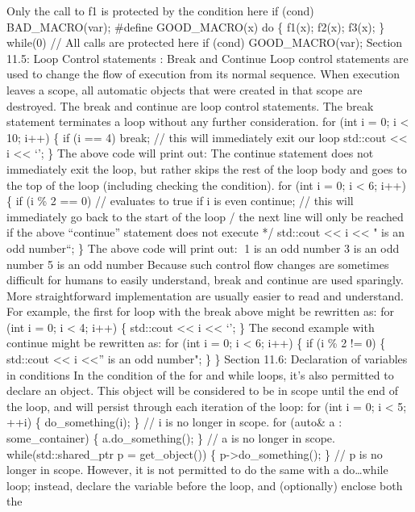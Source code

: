 {Only the call to f1 is protected by the condition here if (cond)
BAD\_MACRO(var); \#define GOOD\_MACRO(x) do \{ f1(x); f2(x); f3(x); \}
while(0) // All calls are protected here if (cond) GOOD\_MACRO(var);
Section 11.5: Loop Control statements : Break and Continue Loop control
statements are used to change the ﬂow of execution from its normal
sequence. When execution leaves a scope, all automatic objects that were
created in that scope are destroyed. The break and continue are loop
control statements. The break statement terminates a loop without any
further consideration. for (int i = 0; i \textless{} 10; i++) \{ if (i
== 4) break; // this will immediately exit our loop std::cout
\textless\textless{} i \textless\textless{} `\n'; \} The above code will
print out: The continue statement does not immediately exit the loop,
but rather skips the rest of the loop body and goes to the top of the
loop (including checking the condition). for (int i = 0; i \textless{}
6; i++) \{ if (i \% 2 == 0) // evaluates to true if i is even continue;
// this will immediately go back to the start of the loop /} the next
line will only be reached if the above ``continue'' statement does not
execute */ std::cout \textless\textless{} i \textless\textless{} " is an
odd number\n``; \} The above code will print out: 1 is an odd number 3
is an odd number 5 is an odd number Because such control ﬂow changes are
sometimes diﬃcult for humans to easily understand, break and continue
are used sparingly. More straightforward implementation are usually
easier to read and understand. For example, the ﬁrst for loop with the
break above might be rewritten as: for (int i = 0; i \textless{} 4; i++)
\{ std::cout \textless\textless{} i \textless\textless{} `\n'; \} The
second example with continue might be rewritten as: for (int i = 0; i
\textless{} 6; i++) \{ if (i \% 2 != 0) \{ std::cout
\textless\textless{} i \textless\textless{}'' is an odd number\n"; \} \}
Section 11.6: Declaration of variables in conditions In the condition of
the for and while loops, it's also permitted to declare an object. This
object will be considered to be in scope until the end of the loop, and
will persist through each iteration of the loop: for (int i = 0; i
\textless{} 5; ++i) \{ do\_something(i); \} // i is no longer in scope.
for (auto\& a : some\_container) \{ a.do\_something(); \} // a is no
longer in scope. while(std::shared\_ptr p = get\_object()) \{
p-\textgreater do\_something(); \} // p is no longer in scope. However,
it is not permitted to do the same with a do\ldots while loop; instead,
declare the variable before the loop, and (optionally) enclose both the
